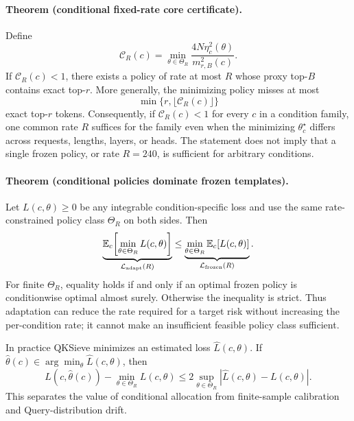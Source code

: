 \paragraph{Theorem (conditional fixed-rate core certificate).}
Define
\begin{equation}
 \mathcal C_R(c)=
 \min_{\theta\in\Theta_R}
 \frac{4N\eta_c^2(\theta)}{m_{r,B}^2(c)} .
 \label{eq:fixed-rate-core-certificate}
\end{equation}
If $\mathcal C_R(c)<1$, there exists a policy of rate at most $R$ whose
proxy top-$B$ contains exact top-$r$.  More generally, the minimizing policy
misses at most
\begin{equation}
 \min\{r,\lfloor\mathcal C_R(c)\rfloor\}
 \label{eq:conditional-fixed-rate-misses}
\end{equation}
exact top-$r$ tokens.  Consequently, if
$\mathcal C_R(c)<1$ for every $c$ in a condition family, one common rate
$R$ suffices for the family even when the minimizing
$\theta_c^\star$ differs across requests, lengths, layers, or heads.
The statement does not imply that a single frozen policy, or rate $R=240$,
is sufficient for arbitrary conditions.

\paragraph{Theorem (conditional policies dominate frozen templates).}
Let $L(c,\theta)\geq0$ be any integrable condition-specific loss and use
the same rate-constrained policy class $\Theta_R$ on both sides.  Then
\begin{equation}
 \underbrace{\mathbb E_c\!
  \left[\min_{\theta\in\Theta_R}L(c,\theta)\right]}
 _{\mathcal L_{\rm adapt}(R)}
 \le
 \underbrace{\min_{\theta\in\Theta_R}
  \mathbb E_c[L(c,\theta)]}
 _{\mathcal L_{\rm frozen}(R)} .
 \label{eq:conditional-policy-dominance}
\end{equation}
For finite $\Theta_R$, equality holds if and only if an optimal frozen
policy is conditionwise optimal almost surely.  Otherwise the inequality
is strict.  Thus adaptation can reduce the rate required for a target
risk without increasing the per-condition rate; it cannot make an
insufficient feasible policy class sufficient.

In practice QKSieve minimizes an estimated loss
$\widehat L(c,\theta)$.  If
$\widehat\theta(c)\in\arg\min_\theta\widehat L(c,\theta)$, then
\begin{equation}
 L(c,\widehat\theta(c))-\min_{\theta\in\Theta_R}L(c,\theta)
 \le
 2\sup_{\theta\in\Theta_R}
 |\widehat L(c,\theta)-L(c,\theta)|.
 \label{eq:conditional-selection-regret}
\end{equation}
This separates the value of conditional allocation from finite-sample
calibration and Query-distribution drift.


